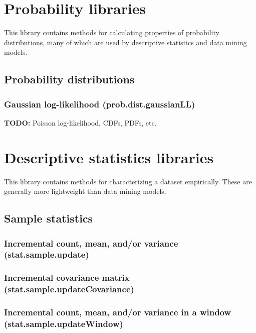 \documentclass{article}
\theoremstyle{definition}
\begin{document}
\pagebreak

\section{Probability libraries}

This library contains methods for calculating properties of probability distributions, many of which are used by descriptive statistics and data mining models.

\subsection{Probability distributions}

\subsubsection{Gaussian log-likelihood (prob.dist.gaussianLL)}

{\bf TODO:} Poisson log-likelihood, CDFs, PDFs, etc.

\pagebreak

\section{Descriptive statistics libraries}

This library contains methods for characterizing a dataset empirically.  These are generally more lightweight than data mining models.

\subsection{Sample statistics}

\subsubsection{Incremental count, mean, and/or variance (stat.sample.update)}

\subsubsection{Incremental covariance matrix (stat.sample.updateCovariance)}

\subsubsection{Incremental count, mean, and/or variance in a window (stat.sample.updateWindow)}
\end{document}
